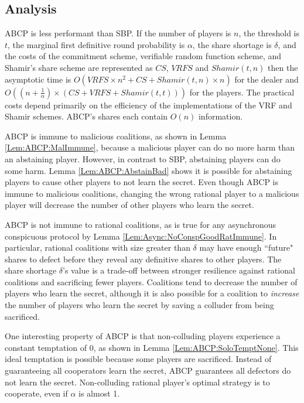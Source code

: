 \documentclass{dalcsthesis}
\begin{document}
\subsection{Analysis}

ABCP is less performant than SBP. If the number of players is $n$, the threshold is $t$, the marginal first definitive round probability is $\alpha$, the share shortage is $\delta$, and the costs of the commitment scheme, verifiable random function scheme, and Shamir's share scheme are represented as $CS$, $VRFS$ and $Shamir(t, n)$ then the asymptotic time is $O(VRFS  \times n^2 + CS + Shamir(t, n) \times n)$ for the dealer and $O((n + \frac{1}{\alpha}) \times (CS + VRFS + Shamir(t, t)))$ for the players. The practical costs depend primarily on the efficiency of the implementations of the VRF and Shamir schemes. ABCP's shares each contain $O(n)$ information.

ABCP is immune to malicious coalitions, as shown in Lemma \ref{Lem:ABCP:MalImmune}, because a malicious player can do no more harm than an abstaining player. However, in contrast to SBP, abstaining players can do some harm. Lemma \ref{Lem:ABCP:AbstainBad} shows it is possible for abstaining players to cause other players to not learn the secret. Even though ABCP is immune to malicious coalitions, changing the wrong rational player to a malicious player will decrease the number of other players who learn the secret.

ABCP is not immune to rational coalitions, as is true for any asynchronous conspicuous protocol by Lemma \ref{Lem:Async:NoConspGoodRatImmune}. In particular, rational coalitions with size greater than $\delta$ may have enough ``future" shares to defect before they reveal any definitive shares to other players. The share shortage $\delta$'s value is a trade-off between stronger resilience against rational coalitions and sacrificing fewer players. Coalitions tend to decrease the number of players who learn the secret, although it is also possible for a coalition to \emph{increase} the number of players who learn the secret by saving a colluder from being sacrificed.

One interesting property of ABCP is that non-colluding players experience a constant temptation of $0$, as shown in Lemma \ref{Lem:ABCP:SoloTemptNone}. This ideal temptation is possible because some players are sacrificed. Instead of guaranteeing all cooperators learn the secret, ABCP guarantees all defectors do not learn the secret. Non-colluding rational player's optimal strategy is to cooperate, even if $\alpha$ is almost 1.
\end{document}
